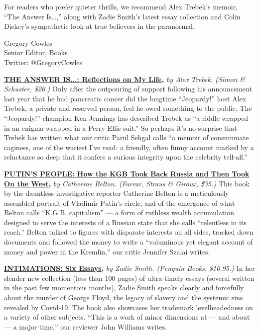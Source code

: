 For readers who prefer quieter thrills, we recommend Alex Trebek's
memoir, ``The Answer Is\ldots{},'' along with Zadie Smith's latest essay
collection and Colin Dickey's sympathetic look at true believers in the
paranormal.

Gregory Cowles\\
Senior Editor, Books\\
Twitter: @GregoryCowles

\href{https://www.nytimes3xbfgragh.onion/2020/07/21/books/review-answer-is-alex-trebek-jeopardy-memoir.html}{\textbf{THE
ANSWER IS...: Reflections on My Life}}\textbf{,} \emph{by Alex Trebek.
(Simon \& Schuster, \$26.)} Only after the outpouring of support
following his announcement last year that he had pancreatic cancer did
the longtime ``Jeopardy!'' host Alex Trebek, a private and reserved
person, feel he owed something to the public. The ``Jeopardy!'' champion
Ken Jennings has described Trebek as ``a riddle wrapped in an enigma
wrapped in a Perry Ellis suit.'' So perhaps it's no surprise that Trebek
has written what our critic Parul Sehgal calls ``a memoir of consummate
caginess, one of the wariest I've read: a friendly, often funny account
marked by a reluctance so deep that it confers a curious integrity upon
the celebrity tell-all.''

\href{https://www.nytimes3xbfgragh.onion/2020/07/16/books/review-putins-people-kgb-catherine-belton.html}{\textbf{PUTIN'S
PEOPLE: How the KGB Took Back Russia and Then Took On the
West}}\textbf{,} \emph{by Catherine Belton. (Farrar, Straus \& Giroux,
\$35.)} This book by the dauntless investigative reporter Catherine
Belton is a meticulously assembled portrait of Vladimir Putin's circle,
and of the emergence of what Belton calls ``K.G.B. capitalism'' --- a
form of ruthless wealth accumulation designed to serve the interests of
a Russian state that she calls ``relentless in its reach.'' Belton
talked to figures with disparate interests on all sides, tracked down
documents and followed the money to write a ``voluminous yet elegant
account of money and power in the Kremlin,'' our critic Jennifer Szalai
writes.

\href{https://www.nytimes3xbfgragh.onion/2020/07/22/books/review-intimations-essays-zadie-smith.html}{\textbf{INTIMATIONS:
Six Essays}}\textbf{,} \emph{by Zadie Smith. (Penguin Books, \$10.95.)}
In her slender new collection (less than 100 pages) of ultra-timely
essays (several written in the past few momentous months), Zadie Smith
speaks clearly and forcefully about the murder of George Floyd, the
legacy of slavery and the systemic sins revealed by Covid-19. The book
also showcases her trademark levelheadedness on a variety of other
subjects. ``This is a work of minor dimensions at --- and about --- a
major time,'' our reviewer John Williams writes.

